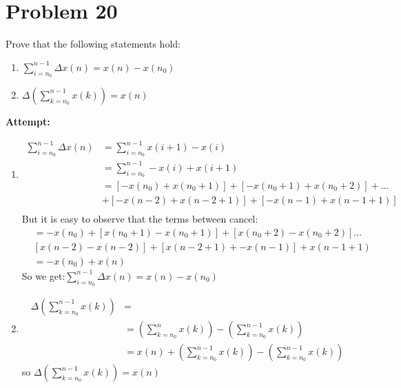 \documentclass[12pt,letterpaper]{article}
\theoremstyle{definition}
\begin{document}
\section*{Problem 20}
Prove that the following statements hold:

\begin{enumerate}[label = (\roman*)]
    \item $\displaystyle \sum_{i=n_0}^{n-1}\Delta x(n) = x(n) - x(n_0)$
    \item $\displaystyle \Delta \left( \sum_{k=n_0}^{n-1} x(k) \right) = x(n)$
\end{enumerate}
\textbf{Attempt:}
\begin{changemargin}{.5cm}{0cm}
    \begin{enumerate}[label = (\roman*)]
    \item \begin{align*}
       \sum_{i=n_0}^{n-1}\Delta x(n)&= \sum_{i=n_0}^{n-1}x(i+1)-x(i)\\
       &= \sum_{i=n_0}^{n-1}-x(i)+x(i+1)\\
       &=[-x(n_0)+x(n_0+1)] +[-x(n_0+1) +x(n_0+2)] + \dots\\ &+[-x(n-2)+x(n-2+1)]+ [-x(n-1)+x(n-1+1)] \\
    \end{align*}  
    But it is easy to observe that the terms between cancel:
    \begin{align*}
        &=-x(n_0)+[x(n_0+1) -x(n_0+1)] +[x(n_0+2) -x(n_0+2)] \dots\\ &[x(n-2)-x(n-2)]+[x(n-2+1)+ -x(n-1)]+x(n-1+1) \\
        &= -x(n_0)+x(n)
    \end{align*}
    So we get:$\displaystyle \sum_{i=n_0}^{n-1}\Delta x(n) = x(n) - x(n_0)$
    
    \item 
    
    \begin{align*}
        \Delta \left( \sum_{k=n_0}^{n-1} x(k) \right)&=\\
        &= \left( \sum_{k=n_0}^{n} x(k) \right)- \left( \sum_{k=n_0}^{n-1} x(k) \right)\\
        &=x(n)+\left( \sum_{k=n_0}^{n-1} x(k) \right)- \left( \sum_{k=n_0}^{n-1} x(k) \right)
    \end{align*}
    so $\displaystyle\Delta \left( \sum_{k=n_0}^{n-1} x(k) \right)=x(n) $

\end{enumerate}
\end{changemargin}

    
\end{document}

